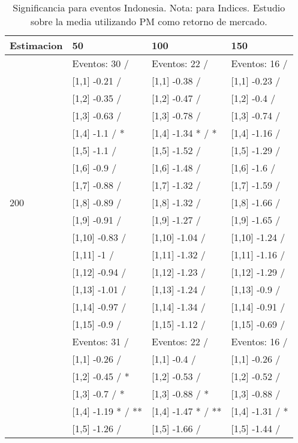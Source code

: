 \begin{table}

\caption{Significancia para eventos Indonesia. Nota: para Indices. Estudio sobre la media utilizando PM como retorno de mercado.}
\centering
\begin{tabular}[t]{llll}
\toprule
Estimacion & 50 & 100 & 150\\
\midrule
 & Eventos:  30 / & Eventos:  22 / & Eventos:  16 /\\
 & {}[1,1] -0.21  / & {}[1,1] -0.38  / & {}[1,1] -0.23  /\\
 & {}[1,2] -0.35  / & {}[1,2] -0.47  / & {}[1,2] -0.4  /\\
 & {}[1,3] -0.63  / & {}[1,3] -0.78  / & {}[1,3] -0.74  /\\
 & {}[1,4] -1.1  / * & {}[1,4] -1.34 * / * & {}[1,4] -1.16  /\\
\addlinespace
 & {}[1,5] -1.1  / & {}[1,5] -1.52  / & {}[1,5] -1.29  /\\
 & {}[1,6] -0.9  / & {}[1,6] -1.48  / & {}[1,6] -1.6  /\\
 & {}[1,7] -0.88  / & {}[1,7] -1.32  / & {}[1,7] -1.59  /\\
200 & {}[1,8] -0.89  / & {}[1,8] -1.32  / & {}[1,8] -1.66  /\\
 & {}[1,9] -0.91  / & {}[1,9] -1.27  / & {}[1,9] -1.65  /\\
\addlinespace
 & {}[1,10] -0.83  / & {}[1,10] -1.04  / & {}[1,10] -1.24  /\\
 & {}[1,11] -1  / & {}[1,11] -1.32  / & {}[1,11] -1.16  /\\
 & {}[1,12] -0.94  / & {}[1,12] -1.23  / & {}[1,12] -1.29  /\\
 & {}[1,13] -1.01  / & {}[1,13] -1.24  / & {}[1,13] -0.9  /\\
 & {}[1,14] -0.97  / & {}[1,14] -1.34  / & {}[1,14] -0.91  /\\
\addlinespace
 & {}[1,15] -0.9  / & {}[1,15] -1.12  / & {}[1,15] -0.69  /\\
 & Eventos:  31 / & Eventos:  22 / & Eventos:  16 /\\
 & {}[1,1] -0.26  / & {}[1,1] -0.4  / & {}[1,1] -0.26  /\\
 & {}[1,2] -0.45  / * & {}[1,2] -0.53  / & {}[1,2] -0.52  /\\
 & {}[1,3] -0.7  / * & {}[1,3] -0.88  / * & {}[1,3] -0.88  /\\
\addlinespace
 & {}[1,4] -1.19 * / ** & {}[1,4] -1.47 * / ** & {}[1,4] -1.31  / *\\
 & {}[1,5] -1.26  / & {}[1,5] -1.66  / & {}[1,5] -1.44  /\\

\end{tabular}
\end{table}
